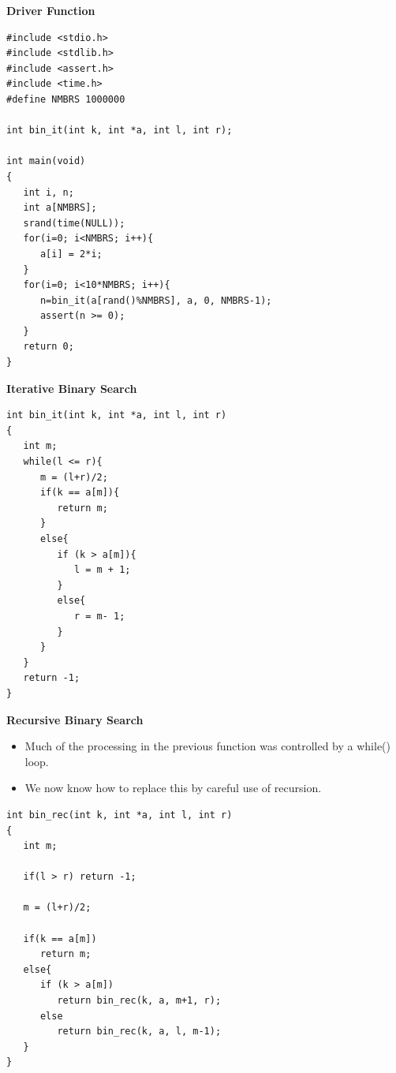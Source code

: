 \documentclass[a4,portraitt]{slides}
\begin{document}
\newpage
{\samepage
\begin{center}
{\Large{\bf Driver Function}}
\end{center}
{\small
\begin{verbatim}
#include <stdio.h>
#include <stdlib.h>
#include <assert.h>
#include <time.h>
#define NMBRS 1000000

int bin_it(int k, int *a, int l, int r);

int main(void)
{
   int i, n;
   int a[NMBRS];
   srand(time(NULL));
   for(i=0; i<NMBRS; i++){
      a[i] = 2*i;
   }
   for(i=0; i<10*NMBRS; i++){
      n=bin_it(a[rand()%NMBRS], a, 0, NMBRS-1);
      assert(n >= 0);
   }
   return 0;
}
\end{verbatim}
}}

\newpage
{\samepage
\begin{center}
{\Large{\bf Iterative Binary Search}}
\end{center}
\begin{verbatim}
int bin_it(int k, int *a, int l, int r)
{
   int m;
   while(l <= r){
      m = (l+r)/2;
      if(k == a[m]){
         return m;
      }
      else{
         if (k > a[m]){
            l = m + 1;
         }
         else{
            r = m- 1;
         }
      }
   }
   return -1;
}
\end{verbatim}
}

\newpage
{\samepage
\begin{center}
{\Large{\bf Recursive Binary Search}}
\end{center}
\begin{itemize}
\item Much of the processing in the previous function was controlled by a  while() loop.
\item We now know how to replace this by careful use of recursion.
\end{itemize}
\begin{verbatim}
int bin_rec(int k, int *a, int l, int r)
{
   int m;

   if(l > r) return -1;

   m = (l+r)/2;

   if(k == a[m])
      return m;
   else{
      if (k > a[m])
         return bin_rec(k, a, m+1, r);
      else
         return bin_rec(k, a, l, m-1);
   }
}
\end{verbatim}
}
\end{document}
